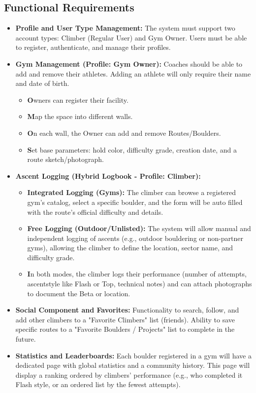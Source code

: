 \subsection{Functional Requirements} \label{sec121}
\begin{itemize}
\item \textbf{Profile and User Type Management:} The system must support two account types: Climber (Regular User) and Gym Owner. Users must be able to register, authenticate, and manage their profiles.
\item \textbf{Gym Management (Profile: Gym Owner):} Coaches should be able to add and remove their athletes. Adding an athlete will only require their name and date of birth.
\begin{itemize}
\item \textbf Owners can register their facility.
\item \textbf Map the space into different walls.
\item \textbf On each wall, the Owner can add and remove Routes/Boulders.
\item \textbf Set base parameters: hold color, difficulty grade, creation date, and a route sketch/photograph.
\end{itemize}
\item \textbf{Ascent Logging (Hybrid Logbook - Profile: Climber):}
\begin{itemize}
\item \textbf{Integrated Logging (Gyms):} The climber can browse a registered gym's catalog, select a specific boulder, and the form will be auto filled with the route's official difficulty and details.
\item \textbf{Free Logging (Outdoor/Unlisted):} The system will allow manual and independent logging of ascents (e.g., outdoor bouldering or non-partner gyms), allowing the climber to define the location, sector name, and difficulty grade.
\item \textbf In both modes, the climber logs their performance (number of attempts, ascentstyle like Flash or Top, technical notes) and can attach photographs to document the Beta or location.
\end{itemize}
\item \textbf{Social Component and Favorites:} Functionality to search, follow, and add other climbers to a "Favorite Climbers" list (friends). Ability to save specific routes to a "Favorite Boulders / Projects" list to complete in the future.
\item \textbf{Statistics and Leaderboards:} Each boulder registered in a gym will have a dedicated page with global statistics and a community history. This page will display a ranking ordered by climbers' performance (e.g., who completed it Flash style, or an ordered list by the fewest attempts).
%
%

\end{itemize}
